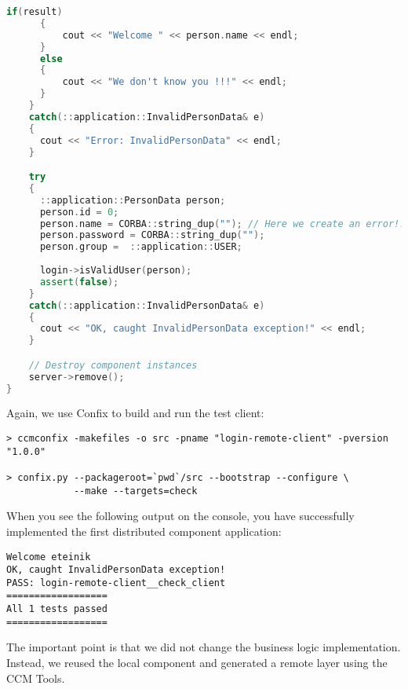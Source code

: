 \begin{footnotesize}
\begin{lstlisting}[language=C++]
      if(result) 
      {
          cout << "Welcome " << person.name << endl;
      }
      else 
      {
          cout << "We don't know you !!!" << endl;
      }
    }
    catch(::application::InvalidPersonData& e)
    {
      cout << "Error: InvalidPersonData" << endl;	
    }

    try 
    {
      ::application::PersonData person;
      person.id = 0;
      person.name = CORBA::string_dup(""); // Here we create an error!!!
      person.password = CORBA::string_dup("");   
      person.group =  ::application::USER;       
      
      login->isValidUser(person);
      assert(false); 
    }
    catch(::application::InvalidPersonData& e)
    {
      cout << "OK, caught InvalidPersonData exception!" << endl;	
    }

    // Destroy component instances
    server->remove();
}
\end{lstlisting}
\end{footnotesize}

Again, we use Confix to build and run the test client:
\begin{footnotesize}
\begin{verbatim}
> ccmconfix -makefiles -o src -pname "login-remote-client" -pversion "1.0.0"

> confix.py --packageroot=`pwd`/src --bootstrap --configure \
            --make --targets=check
\end{verbatim}
\end{footnotesize}

When you see the following output on the console, you have successfully
implemented the first distributed component application:
\begin{footnotesize}
\begin{verbatim}
Welcome eteinik
OK, caught InvalidPersonData exception!
PASS: login-remote-client__check_client
==================
All 1 tests passed
==================
\end{verbatim}
\end{footnotesize}

The important point is that we did not change the business logic implementation.
Instead, we reused the local component and generated a remote layer using the
CCM Tools.

\newpage